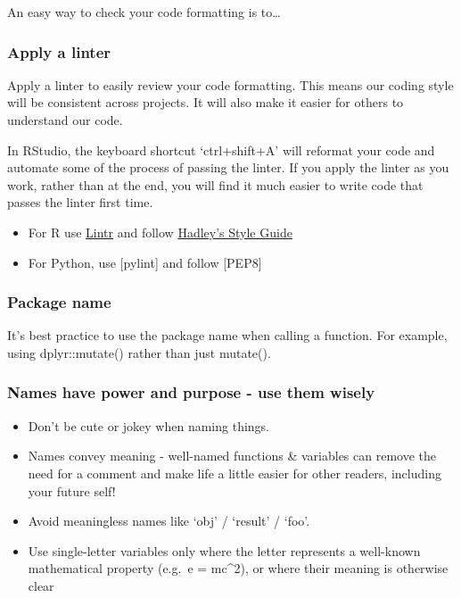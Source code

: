 \documentclass[]{book}
\providecommand{\tightlist}{%
  \setlength{\itemsep}{0pt}\setlength{\parskip}{0pt}}
\begin{document}
An easy way to check your code formatting is to\ldots{}

\hypertarget{linter}{%
\subsubsection{Apply a linter}\label{linter}}

Apply a linter to easily review your code formatting. This means our coding style will be consistent across projects. It will also make it easier for others to understand our code.

In RStudio, the keyboard shortcut `ctrl+shift+A' will reformat your code and automate some of the process of passing the linter. If you apply the linter as you work, rather than at the end, you will find it much easier to write code that passes the linter first time.

\begin{itemize}
\tightlist
\item
  For R use \href{https://cran.r-project.org/web/packages/lintr/readme/README.html}{Lintr} and follow \href{http://adv-r.had.co.nz/Style.html}{Hadley's Style Guide}\\
\item
  For Python, use {[}pylint{]} and follow {[}PEP8{]}
\end{itemize}

\hypertarget{package-name}{%
\subsubsection{Package name}\label{package-name}}

It's best practice to use the package name when calling a function. For example, using dplyr::mutate() rather than just mutate().

\hypertarget{names}{%
\subsubsection{Names have power and purpose - use them wisely}\label{names}}

\begin{itemize}
\tightlist
\item
  Don't be cute or jokey when naming things.
\item
  Names convey meaning - well-named functions \& variables can remove the need for a comment and make life a little easier for other readers, including your future self!
\item
  Avoid meaningless names like `obj' / `result' / `foo'.
\item
  Use single-letter variables only where the letter represents a well-known mathematical property (e.g.~e = mc\^{}2), or where their meaning is otherwise clear
\end{itemize}
\end{document}
